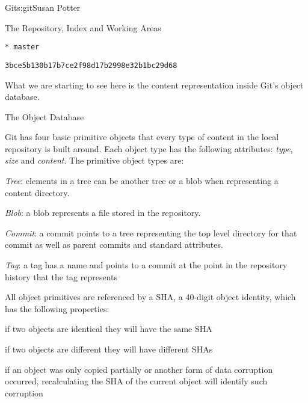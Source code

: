 \begin{aosachapter}{Git}{s:git}{Susan Potter}
\begin{aosasect1}{The Repository, Index and Working Areas}
\begin{aosaitemize}
  \item {}
  \item {}
\begin{verbatim}
* master
\end{verbatim}
  \item {}
\begin{verbatim}
3bce5b130b17b7ce2f98d17b2998e32b1bc29d68
\end{verbatim}
  \item {}
\end{aosaitemize}

What we are starting to see here is the content representation inside Git's
object database.

\end{aosasect1}

\begin{aosasect1}{The Object Database}


Git has four basic primitive objects that every type of content in the
local repository is built around. Each object type has the following
attributes: \emph{type}, \emph{size} and \emph{content}. The primitive object
types are:
\begin{aosaitemize}
  \item \emph{Tree}: elements in a tree can be another tree or a blob when
  representing a content directory.
  \item \emph{Blob}: a blob represents a file stored in the repository.
  \item \emph{Commit}: a commit points to a tree representing the top level
  directory for that commit as well as parent commits and standard
  attributes.
  \item \emph{Tag}: a tag has a name and points to a commit at the point in
  the repository history that the tag represents
\end{aosaitemize}

All object primitives are referenced by a SHA, a 40-digit object identity,
which has the following properties:
\begin{aosaitemize}
  \item if two objects are identical they will have the same SHA
  \item if two objects are different they will have different SHAs
  \item if an object was only copied partially or another form of data
        corruption occurred, recalculating the SHA of the current object
        will identify such corruption
\end{aosaitemize}


\end{aosasect1}
\end{aosachapter}
